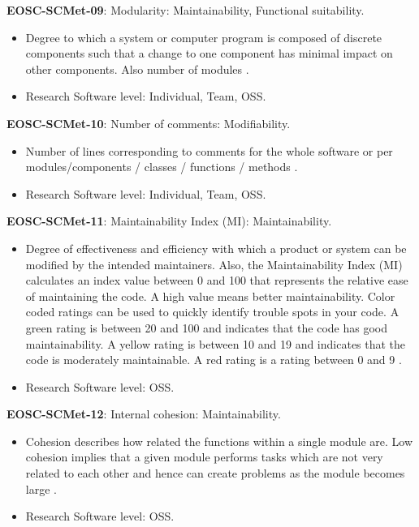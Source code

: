 \textbf{EOSC-SCMet-09}: Modularity: Maintainability, Functional suitability.

\begin{itemize}
    \item Degree to which a system or computer program is composed of discrete components such that a change to one component has minimal impact on other components. Also number of modules \cite{iso_25010_2011_2017,montagud_systematic_2012,aberdour_achieving_2007,ogasawara_experiences_1996,shepherdson_cessda_2019}.
    \item Research Software level: Individual, Team, OSS.
\end{itemize}

\textbf{EOSC-SCMet-10}: Number of comments: Modifiability.

\begin{itemize}
    \item Number of lines corresponding to comments for the whole software or per modules/components / classes / functions / methods \cite{srisopha_software_2018,montagud_systematic_2012,ogasawara_experiences_1996}.
    \item Research Software level: Individual, Team, OSS.
\end{itemize}

\textbf{EOSC-SCMet-11}: Maintainability Index (MI): Maintainability.

\begin{itemize}
    \item Degree of effectiveness and efficiency with which a product or system can be modified by the intended maintainers. Also, the Maintainability Index (MI) calculates an index value between 0 and 100 that represents the relative ease of maintaining the code. A high value means better maintainability. Color coded ratings can be used to quickly identify trouble spots in your code. A green rating is between 20 and 100 and indicates that the code has good maintainability. A yellow rating is between 10 and 19 and indicates that the code is moderately maintainable. A red rating is a rating between 0 and 9 \cite{iso_25010_2011_2017,montagud_systematic_2012}.
    \item Research Software level: OSS.
\end{itemize}

\textbf{EOSC-SCMet-12}: Internal cohesion: Maintainability.

\begin{itemize}
    \item Cohesion describes how related the functions within a single module are. Low cohesion implies that a given module performs tasks which are not very related to each other and hence can create problems as the module becomes large \cite{iso_central_secretary_isoiecieee_2010,montagud_systematic_2012}.
    \item Research Software level: OSS.
\end{itemize}

